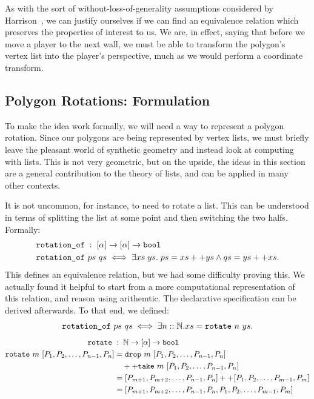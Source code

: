 As with the sort of without-loss-of-generality assumptions considered by Harrison~\cite{HarrisonWLOG}, we can justify ourselves if we can find an equivalence relation which preserves the properties of interest to us. We are, in effect, saying that before we move a player to the next wall, we must be able to transform the polygon's vertex list into the player's perspective, much as we would perform a coordinate transform.

\subsection{Polygon Rotations: Formulation}
To make the idea work formally, we will need a way to represent a polygon rotation. Since our polygons are being represented by vertex lists, we must briefly leave the pleasant world of synthetic geometry and instead look at computing with lists. This is not very geometric, but on the upside, the ideas in this section are a general contribution to the theory of lists, and can be applied in many other contexts. 

It is not uncommon, for instance, to need to rotate a list. This can be understood in terms of splitting the list at some point and then switching the two halfs. Formally:
\begin{displaymath}
  \begin{split}
&\texttt{rotation\_of}\; :\; [\alpha] \rightarrow [\alpha] \rightarrow \texttt{bool}\\
&\texttt{rotation\_of}\ ps\ qs \iff \exists xs\;ys.\; ps = xs ++ ys \wedge qs = ys ++ xs.\\
  \end{split}
\end{displaymath}
This defines an equivalence relation, but we had some difficulty proving this. We actually found it helpful to start from a more computational representation of this relation, and reason using arithemtic. The declarative specification can be derived afterwards. To that end, we defined:
\begin{displaymath}
\code{rotation\_of}\ ps\ qs \iff \exists n::\mathbb{N}. xs = \code{rotate}\ n\ ys.
\end{displaymath}
\begin{displaymath}
  \begin{aligned}
\code{rotate}\; &: \; \mathbb{N} \rightarrow [\alpha] \rightarrow \code{bool}\\
\code{rotate}\ m\ [P_1,P_2,\ldots,P_{n-1},P_n] &= \code{drop}\ m\ [P_1,P_2,\ldots,P_{n-1},P_n]\\
&\quad++ \code{take}\ m\ [P_1,P_2,\ldots,P_{n-1},P_n]\\
&= [P_{m+1},P_{m+2},\ldots,P_{n-1},P_n] ++ [P_1,P_2,\ldots,P_{m-1},P_m]\\
&= [P_{m+1},P_{m+2},\ldots,P_{n-1},P_n,P_1,P_2,\ldots,P_{m-1},P_m]\\
  \end{aligned}
\end{displaymath}

